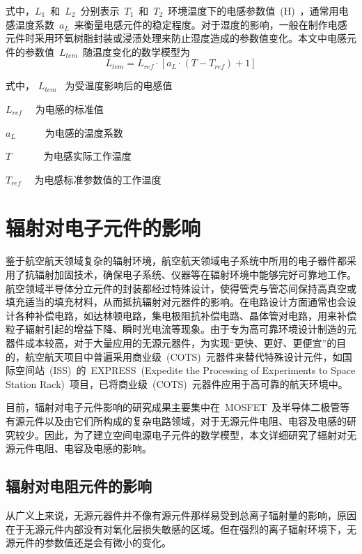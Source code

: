 式中，$L_1$~和~$L_2$~分别表示~$T_1$~和~$T_2$~环境温度下的电感参数值~(H)~，通常用电感温度系数~$a_L$~来衡量电感元件的稳定程度。对于湿度的影响，一般在制作电感元件时采用环氧树脂封装或浸渍处理来防止湿度造成的参数值变化\cite{Dong2006Sensor}。本文中电感元件的参数值~$L_{tem}$~随温度变化的数学模型为
\begin{equation}\label{equ:chap2:Index5}
L_{tem}=L_{ref}\cdot\left[a_L\cdot\left(T-T_{ref}\right)+1\right]
\end{equation}

式中， $L_{tem}$ ~为受温度影响后的电感值

\hspace{1.3cm}$L_{ref}$ ~~为电感的标准值

\hspace{1.3cm}$a_L$\ ~~~~~为电感的温度系数

\hspace{1.3cm}$T$  \ ~~~~~为电感实际工作温度

\hspace{1.3cm}$T_{ref}$ ~~为电感标准参数值的工作温度
\section{辐射对电子元件的影响}
\label{sec:chap2:radia_ele}
鉴于航空航天领域复杂的辐射环境，航空航天领域电子系统中所用的电子器件都采用了抗辐射加固技术，确保电子系统、仪器等在辐射环境中能够完好可靠地工作。航空领域半导体分立元件的封装都经过特殊设计，使得管壳与管芯间保持高真空或填充适当的填充材料，从而抵抗辐射对元器件的影响。在电路设计方面通常也会设计各种补偿电路，如达林顿电路，集电极阻抗补偿电路、晶体管对电路，用来补偿粒子辐射引起的增益下降、瞬时光电流等现象。由于专为高可靠环境设计制造的元器件成本较高，对于大量应用的无源元器件，为实现“更快、更好、更便宜”的目的，航空航天项目中普遍采用商业级~(COTS)~元器件来替代特殊设计元件，如国际空间站~(ISS)~的~EXPRESS~(Expedite the Processing of Experiments to Space Station Rack)~项目，已将商业级~(COTS)~元器件应用于高可靠的航天环境中\cite{Cook2013Capabilities}。

目前，辐射对电子元件影响的研究成果主要集中在~MOSFET~及半导体二极管等有源元件以及由它们所构成的复杂电路领域，对于无源元件电阻、电容及电感的研究较少。因此，为了建立空间电源电子元件的数学模型，本文详细研究了辐射对无源元件电阻、电容及电感的影响。
\subsection{辐射对电阻元件的影响}
从广义上来说，无源元器件并不像有源元件那样易受到总离子辐射量的影响，原因在于无源元件内部没有对氧化层损失敏感的区域。但在强烈的离子辐射环境下，无源元件的参数值还是会有微小的变化。

